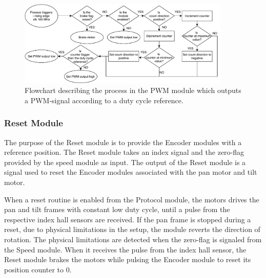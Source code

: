 \documentclass[../../main.tex]{subfiles}
\begin{document}
\begin{figure}[H]
    \centering
    \includegraphics[width=0.9\textwidth]{Sections/System_Implementation/Images/FPGAProcessPWMOutput.pdf}
    \caption{Flowchart describing the process in the PWM module which outputs a PWM-signal according to a duty cycle reference.}
    \label{fig:FPGAProcessPWMOut}
\end{figure}

\subsubsection*{Reset Module}
The purpose of the Reset module is to provide the Encoder modules with a reference position.
The Reset module takes an index signal and the zero-flag provided by the speed module as input. The output of the Reset module is a signal used to reset the Encoder modules associated with the pan motor and tilt motor. 


When a reset routine is enabled from the Protocol module, the motors drives the pan and tilt frames with constant low duty cycle, until a pulse from the respective index hall sensors are received. If the pan frame is stopped during a reset, due to physical limitations in the setup, the module reverts the direction of rotation. The physical limitations are detected when the zero-flag is signaled from the Speed module. When it receives the pulse from the index hall sensor, the Reset module brakes the motors while pulsing the Encoder module to reset its position counter to 0. 



\end{document}
